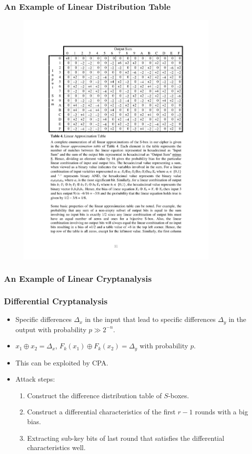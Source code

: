 \begin{frame}\frametitle{An Example of Linear Distribution Table}
\begin{figure}
\begin{center}
\includegraphics[width=100mm]{pic/linear-table} 
\end{center}
\end{figure}
\end{frame}
\begin{frame}\frametitle{An Example of Linear Cryptanalysis}
\begin{figure}
\begin{center}

\end{center}
\end{figure}
\end{frame}
\begin{frame}\frametitle{Differential Cryptanalysis}
\begin{itemize}
\item Specific differences $\Delta_x$ in the input that lead to specific differences $\Delta_y$ in the output with probability $p \gg 2^{-n}$.
\item $x_1\oplus x_2=\Delta_x$, $F_k(x_1) \oplus F_k(x_2)=\Delta_y$ with probability $p$.
\item This can be exploited by CPA.
\item Attack steps:
\begin{enumerate}
\item Construct the difference distribution table of $S$-boxes.
\item Construct a differential characteristics of the first $r-1$ rounds with a big bias.
\item Extracting sub-key bits of last round that satisfies the differential characteristics well.
\end{enumerate}
\end{itemize}
\end{frame}
